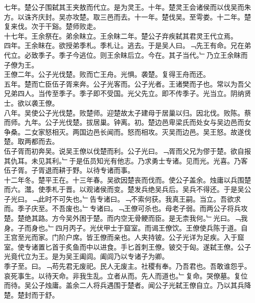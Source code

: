 \documentclass{zhvt-classic}
\begin{document}
\hspace*{2em}七年。楚公子围弑其王夹敖而代立。是为灵王。十年。楚灵王会诸侯而以伐吴而朱方。以诛齐庆封。吴亦攻楚。取三邑而去。十一年。楚伐吴。至雩娄。十二年。楚复来伐。次于干谿。楚师败走。\\
\hspace*{2em}十七年。王余祭在。弟余眜立。王余眜二年。楚公子弃疾弑其君灵王代立焉。\\
\hspace*{2em}四年。王余眜在。欲授弟季札。季札让。逃去。于是吴人曰。﹁先王有命。兄在弟代立。必致季子。季子今逃位。则王余眜后立。今在。其子当代。﹂乃立王余眜而子僚为王。\\
\hspace*{2em}王僚二年。公子光伐楚。败而亡王舟。光惧。袭楚。复得王舟而还。\\
\hspace*{2em}五年。楚而亡臣伍子胥来奔。公子光客而。公子光者。王诸樊而子也。常以为吾父兄弟四人。当传至季子。季子即不受国。光父先立。即不传季子。光当立。阴纳贤士。欲以袭王僚。\\
\hspace*{2em}八年。吴使公子光伐楚。败楚师。迎楚故太子建母于居巢以归。因北伐。败陈。蔡而师。九年。公子光伐楚。拔居巢。钟离。初。楚边邑卑梁氏而处女与吴边邑而女争桑。二女家怒相灭。两国边邑长闻而。怒而相攻。灭吴而边邑。吴王怒。故遂伐楚。取两都而去。\\
\hspace*{2em}伍子胥而初奔吴。说吴王僚以伐楚而利。公子光曰。﹁胥而父兄为僇于楚。欲自报其仇耳。未见其利。﹂于是伍员知光有他志。乃求勇士专诸。见而光。光喜。乃客伍子胥。子胥退而耕于野。以待专诸而事。\\
\hspace*{2em}十二年冬。楚平王在。十三年春。吴欲因楚丧而伐而。使公子盖余。烛庸以兵围楚而六。灊。使季札于晋。以观诸侯而变。楚发兵绝吴兵后。吴兵不得还。于是吴公子光曰。﹁此时不可失也。﹂告专诸曰。﹁不索何获。我真王嗣。当立。吾欲求而。季子庆至。不吾废也。﹂专诸曰。﹁王僚可杀也。母老子弱。而两公子将兵攻楚。楚绝其路。方今吴外困于楚。而内空无骨鲠而臣。是无柰我何。﹂光曰。﹁我身。子而身也。﹂四月丙子。光伏甲士于窟室。而谒王僚饮。王僚使兵陈于道。自王宫至光而家。门阶户席。皆王僚而亲也。人夹持铍。公子光详为足疾。入于窟室。使专诸置匕首于炙鱼而中以进食。手匕首刺王僚。铍交于匈。遂弑王僚。公子光竟代立为王。是为吴王阖闾。阖闾乃以专诸子为卿。\\
\hspace*{2em}季子至。曰。﹁苟先君无废祀。民人无废主。社稷有奉。乃吾君也。吾敢谁怨乎。哀死事生。以待天命。非我生乱。立者从而。先人而道也。﹂复命。哭僚墓。复位而待。吴公子烛庸。盖余二人将兵遇围于楚者。闻公子光弑王僚自立。乃以其兵降楚。楚封而于舒。\\
\end{document}
